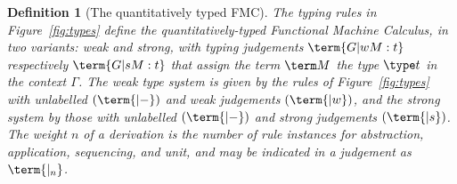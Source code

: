 \documentclass[10pt,a4paper]{amsart}
\newtheorem{definition}[theorem]{Definition}
\newcommand\defn\emph
\begin{document}
\begin{definition}[The quantitatively typed FMC]
The typing rules in Figure~\ref{fig:types} define the \defn{quantitatively-typed Functional Machine Calculus}, in two variants: \emph{weak} and \emph{strong}, with typing judgements $\term{G |w M:t}$ respectively $\term{G |s M:t}$ that assign the term $\term M$ the type $\type t$ in the context $\Gamma$. The weak type system is given by the rules of Figure~\ref{fig:types} with unlabelled $(\term{|-})$ and weak judgements $(\term{|w})$, and the strong system  by those with unlabelled $(\term{|-})$ and strong judgements $(\term{|s})$. The \emph{weight} $n$ of a derivation is the number of rule instances for abstraction, application, sequencing, and unit, and may be indicated in a judgement as $\term{|_n}$.
\end{definition}
\end{document}
